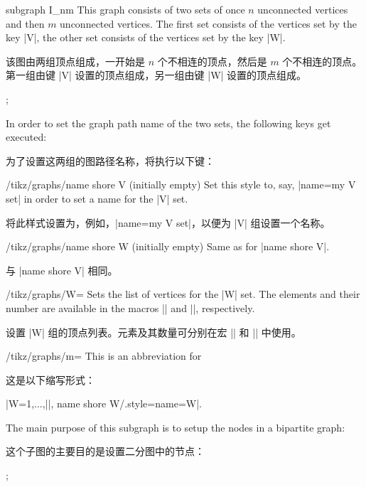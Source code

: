 \begin{graph}{subgraph I\_nm}
    This graph consists of two sets of once $n$ unconnected vertices and then
    $m$ unconnected vertices. The first set consists of the vertices set by the
    key |V|, the other set consists of the vertices set by the key |W|.
    
    该图由两组顶点组成，一开始是 $n$ 个不相连的顶点，然后是 $m$ 个不相连的顶点。第一组由键 |V| 设置的顶点组成，另一组由键 |W| 设置的顶点组成。

\begin{codeexample}[preamble={\usetikzlibrary{graphs.standard}}]
\tikz {};
\end{codeexample}
    In order to set the graph path name of the two sets, the following keys get
    executed:
    
    为了设置这两组的图路径名称，将执行以下键：
    \begin{stylekey}{/tikz/graphs/name shore V (initially \normalfont empty)}
        Set this style to, say, |name=my V set| in order to set a name for the
        |V| set.

        将此样式设置为，例如，|name=my V set|，以便为 |V| 组设置一个名称。

    \end{stylekey}
    \begin{stylekey}{/tikz/graphs/name shore W (initially \normalfont empty)}
        Same as for |name shore V|.

        与 |name shore V| 相同。
    \end{stylekey}
    \begin{key}{/tikz/graphs/W=}
        Sets the list of vertices for the |W| set. The elements and their
        number are available in the macros |\tikzgraphW| and |\tikzgraphWnum|,
        respectively.

        设置 |W| 组的顶点列表。元素及其数量可分别在宏 |\tikzgraphW| 和 |\tikzgraphWnum| 中使用。
    \end{key}
    \begin{key}{/tikz/graphs/m=}
        This is an abbreviation for

        这是以下缩写形式：

        |W={1,...,||}, name shore W/.style={name=W}|.
    \end{key}
    The main purpose of this subgraph is to setup the nodes in a bipartite
    graph:

    这个子图的主要目的是设置二分图中的节点：

\begin{codeexample}[preamble={\usetikzlibrary{graphs.standard}}]
\tikz {};
\end{codeexample}
\end{graph}

